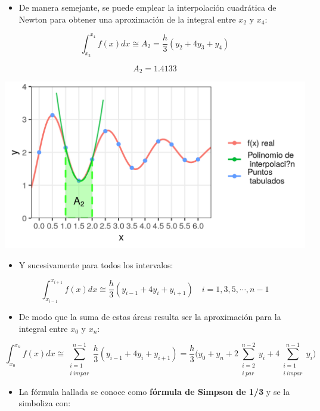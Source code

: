 \documentclass[openany]{book}
\providecommand{\tightlist}{%
  \setlength{\itemsep}{0pt}\setlength{\parskip}{0pt}}
\begin{document}
\begin{itemize}
\tightlist
\item
  De manera semejante, se puede emplear la interpolación cuadrática de Newton para obtener una aproximación de la integral entre \(x_2\) y \(x_4\):
\end{itemize}

\[
\int_{x_2}^{x_4} f(x)dx \cong A_2 = \frac{h}{3} (y_2 + 4y_3 + y_4)
\]

\[A_2=1.4133\]

\begin{center}\includegraphics[width=1\linewidth]{Plots/U4/Unidad4_2_g6} \end{center}

\begin{itemize}
\tightlist
\item
  Y sucesivamente para todos los intervalos:
\end{itemize}

\[
\int_{x_{i-1}}^{x_{i+1}} f(x)dx \cong  \frac{h}{3} (y_{i-1} + 4y_i + y_{i+1}) \quad i = 1, 3, 5, \cdots, n-1
\]

\begin{itemize}
\tightlist
\item
  De modo que la suma de estas áreas resulta ser la aproximación para la integral entre \(x_0\) y \(x_n\):
\end{itemize}

\[
\int_{x_{0}}^{x_n} f(x)dx \cong \sum\limits_{\substack{i = 1\\ i~impar}}^{n-1} \frac{h}{3} (y_{i-1} + 4y_i + y_{i+1}) = \frac{h}{3} \Big( y_0 + y_n + 2 \sum \limits_{\substack{i = 2\\ i~par}}^{n-2} y_i + 4 \sum\limits_{\substack{i = 1\\ i~impar}}^{n-1} y_i  \Big)
\]

\begin{itemize}
\tightlist
\item
  La fórmula hallada se conoce como \textbf{fórmula de Simpson de 1/3} y se la simboliza con:
\end{itemize}
\end{document}
